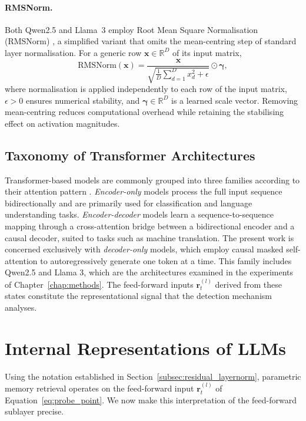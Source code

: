 \paragraph{RMSNorm.}
Both Qwen2.5 and Llama~3 employ Root Mean Square Normalisation (RMSNorm)
\citep{zhang2019rmsnorm}, a simplified variant that omits the mean-centring step
of standard layer normalisation. For a generic row $\mathbf{x} \in \mathbb{R}^D$
of its input matrix,
\begin{equation}
    \mathrm{RMSNorm}\!\left(\mathbf{x}\right)
    =
    \frac{\mathbf{x}}
         {\sqrt{\frac{1}{D}\sum_{d=1}^{D} x_d^2 + \epsilon}}
    \odot \boldsymbol{\gamma},
    \label{eq:rmsnorm}
\end{equation}
where normalisation is applied independently to each row of the input matrix,
$\epsilon > 0$ ensures numerical stability, and $\boldsymbol{\gamma} \in
\mathbb{R}^D$ is a learned scale vector. Removing mean-centring reduces
computational overhead while retaining the stabilising effect on activation
magnitudes.
\subsection{Taxonomy of Transformer Architectures}
\label{subsec:transformer_taxonomy}

Transformer-based models are commonly grouped into three families according to their
attention pattern \citep{tunstall2022natural}. \emph{Encoder-only} models process
the full input sequence bidirectionally and are primarily used for classification
and language understanding tasks. \emph{Encoder-decoder} models learn a
sequence-to-sequence mapping through a cross-attention bridge between a bidirectional
encoder and a causal decoder, suited to tasks such as machine translation. The
present work is concerned exclusively with \emph{decoder-only} models, which employ
causal masked self-attention to autoregressively generate one token at a time. This family includes Qwen2.5 and Llama 3, which are the architectures examined in the experiments of Chapter~\ref{chap:methods}. The feed-forward inputs $\mathbf{r}_t^{(l)}$ derived from
these states constitute the representational signal that the detection mechanism
analyses.
\section{Internal Representations of LLMs}
\label{sec:internal_representations}
Using the notation established in Section~\ref{subsec:residual_layernorm}, parametric memory retrieval operates on the feed-forward input $\mathbf{r}_t^{(l)}$ of Equation~\eqref{eq:probe_point}. We now make this interpretation of the feed-forward sublayer precise.

